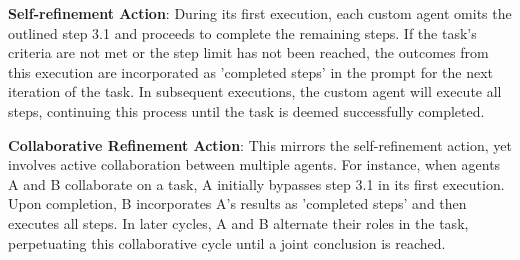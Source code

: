 \textbf{Self-refinement Action}: During its first execution, each custom agent omits the outlined step 3.1 and proceeds to complete the remaining steps. If the task's criteria are not met or the step limit has not been reached, the outcomes from this execution are incorporated as 'completed steps' in the prompt for the next iteration of the task. In subsequent executions, the custom agent will execute all steps, continuing this process until the task is deemed successfully completed.

\textbf{Collaborative Refinement Action}: This mirrors the self-refinement action, yet involves active collaboration between multiple agents. For instance, when agents A and B collaborate on a task, A initially bypasses step 3.1 in its first execution. Upon completion, B incorporates A's results as 'completed steps' and then executes all steps. In later cycles, A and B alternate their roles in the task, perpetuating this collaborative cycle until a joint conclusion is reached.